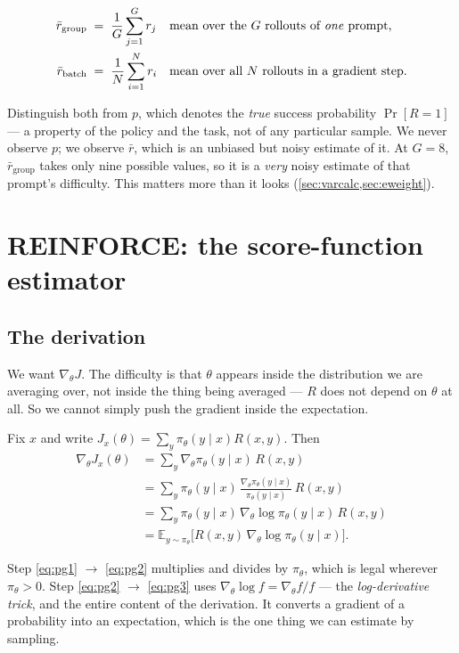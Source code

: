 \documentclass[11pt,letterpaper]{article}
\theoremstyle{definition}
\newcommand{\E}{\mathbb{E}}
\newcommand{\pol}{\pi_\theta}
\newcommand{\grad}{\nabla_\theta}
\begin{document}
\begin{align}
  \bar{r}_{\text{group}} \;&=\; \frac{1}{G}\sum_{j=1}^{G} r_j
    &&\text{mean over the $G$ rollouts of \emph{one} prompt,} \\
  \bar{r}_{\text{batch}} \;&=\; \frac{1}{N}\sum_{i=1}^{N} r_i
    &&\text{mean over all $N$ rollouts in a gradient step.}
\end{align}

Distinguish both from $p$, which denotes the \emph{true} success probability $\Pr[R = 1]$ --- a
property of the policy and the task, not of any particular sample. We never observe $p$; we observe
$\bar{r}$, which is an unbiased but noisy estimate of it. At $G = 8$, $\bar{r}_{\text{group}}$ takes
only nine possible values, so it is a \emph{very} noisy estimate of that prompt's difficulty. This
matters more than it looks (\cref{sec:varcalc,sec:eweight}).

\section{REINFORCE: the score-function estimator}
\label{sec:reinforce}

\subsection{The derivation}

We want $\grad J$. The difficulty is that $\theta$ appears inside the distribution we are averaging
over, not inside the thing being averaged --- $R$ does not depend on $\theta$ at all. So we cannot
simply push the gradient inside the expectation.

Fix $x$ and write $J_x(\theta) = \sum_y \pol(y \mid x) R(x,y)$. Then
\begin{align}
  \grad J_x(\theta)
    &= \sum_y \grad \pol(y \mid x) \, R(x,y) \label{eq:pg1}\\
    &= \sum_y \pol(y \mid x) \, \frac{\grad \pol(y \mid x)}{\pol(y \mid x)} \, R(x,y) \label{eq:pg2}\\
    &= \sum_y \pol(y \mid x) \, \grad \log \pol(y \mid x) \, R(x,y) \label{eq:pg3}\\
    &= \E_{y \sim \pol}\big[ R(x,y) \, \grad \log \pol(y \mid x) \big]. \label{eq:pg4}
\end{align}

Step \eqref{eq:pg1} $\to$ \eqref{eq:pg2} multiplies and divides by $\pol$, which is legal wherever
$\pol > 0$. Step \eqref{eq:pg2} $\to$ \eqref{eq:pg3} uses $\grad \log f = \grad f / f$ --- the
\emph{log-derivative trick}, and the entire content of the derivation. It converts a gradient of a
probability into an expectation, which is the one thing we can estimate by sampling.
\end{document}
